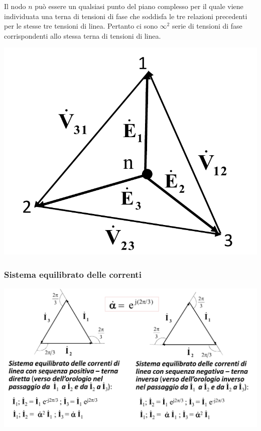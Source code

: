 \documentclass{article}
\begin{document}
Il nodo $n$ può essere un qualsiasi punto del piano
complesso per il quale viene individuata una terna
di tensioni di fase che soddisfa le tre relazioni
precedenti per le stesse tre tensioni di linea. Pertanto ci sono $\infty ^2$ serie di tensioni di fase corrispondenti allo stessa terna di tensioni di linea.
\begin{center}
    \includegraphics[scale=0.3]{Image/Triangolo_delle_tensioni_concate_e_tensioni_di_fase.png}
\end{center}


\subsubsection{Sistema equilibrato delle correnti}
\begin{center}
    \includegraphics[scale=0.3]{Image/Sistema_equilibrato_delle_correnti.png}
\end{center}
\end{document}
